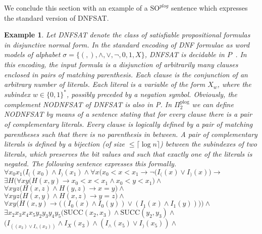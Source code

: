 \documentclass{article}
\newtheorem{example}{Example}
\begin{document}
We conclude this section with an example of a $\mathrm{SO}^{\mathit{plog}}$ sentence which expresses the standard version of DNFSAT.
\begin{example}
Let DNFSAT denote the class of satisfiable propositional formulas in disjunctive normal form.
In the standard encoding of DNF formulae as word models of alphabet $\sigma = \{(,),\wedge,\vee, \neg, 0, 1, X\}$, DNFSAT is decidable in $P$~\cite{Cook_71}. In this encoding, 
the input formula is a disjunction of arbitrarily many clauses enclosed in pairs of matching parenthesis. Each clause is the conjunction of an arbitrary number of literals. Each literal is a variable of the form $X_w$, where the subindex $w \in \{0, 1\}^*$, possibly preceded by a negation symbol.
Obviously, the complement NODNFSAT of DNFSAT is also in P. In $\Pi^{\mathrm{plog}}_2$ we can define NODNFSAT by means of a sentence stating that for every clause there is a pair of complementary literals. Every clause is logically defined by a pair of matching parentheses such that there is no parenthesis in between. A pair of complementary literals is defined by a bijection (of size $\leq \lceil \log n \rceil$) between the subindexes of two literals, which preserves the bit values and such that exactly one of the literals is negated. The following sentence expresses this formally. \\[0.4cm]
$\forall x_0 x_1 \Bigg(I_((x_0) \wedge I_)(x_1) \wedge \forall x \big(x_0 < x < x_1 \rightarrow \neg (I_((x)\vee I_)(x)\big) \rightarrow$\\ 
\hspace*{1.3cm} $\exists H \bigg(\forall x y \big(H(x, y) \rightarrow x_0 < x < x_1 \wedge x_0 < y < x_1 \big) \wedge$\\ 
\hspace*{1.9cm} $\forall x y z \big(H(x, z) \wedge H(y, z) \rightarrow x = y\big) \wedge$\\[0.1cm]
\hspace*{1.9cm} $\forall x y z \big(H(x, y) \wedge H(x, z) \rightarrow y = z\big) \wedge$\\[0.1cm]
\hspace*{1.9cm} $\forall x y \big(H(x, y) \rightarrow \big((I_0(x) \wedge I_0(y)) \vee (I_1(x) \wedge I_1(y)) \big) \big) \wedge$\\[0.1cm]
\hspace*{1.9cm} $\exists x_2 x_3 x_4 x_5 y_2 y_3 y_4 y_5 \Big(\mathrm{SUCC}(x_2, x_3) \wedge \mathrm{SUCC}(y_2, y_3) \wedge$\\
\hspace*{2.5cm} $(I_((x_2) \vee I_\wedge(x_2)) \wedge I_X(x_3) \wedge (I_\wedge(x_5) \vee I_)(x_5)) \wedge$\\[0.1cm]

\end{example}
\end{document}
